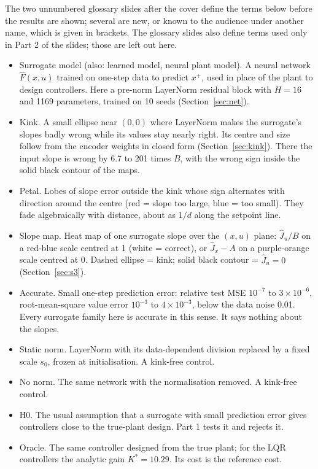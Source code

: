 \documentclass[11pt]{article}
\begin{document}
The two unnumbered glossary slides after the cover define the terms below before the results are shown; several are new, or known to the audience under another name, which is given in brackets. The glossary slides also define terms used only in Part 2 of the slides; those are left out here.

\begin{itemize}
\item Surrogate model (also: learned model, neural plant model). A neural network $\hat F(x,u)$ trained on one-step data to predict $x^+$, used in place of the plant to design controllers. Here a pre-norm LayerNorm residual block with $H=16$ and 1169 parameters, trained on 10 seeds (Section~\ref{sec:net}).
\item Kink. A small ellipse near $(0,0)$ where LayerNorm makes the surrogate's slopes badly wrong while its values stay nearly right. Its centre and size follow from the encoder weights in closed form (Section~\ref{sec:kink}). There the input slope is wrong by 6.7 to 201 times $B$, with the wrong sign inside the solid black contour of the maps.
\item Petal. Lobes of slope error outside the kink whose sign alternates with direction around the centre (red = slope too large, blue = too small). They fade algebraically with distance, about as $1/d$ along the setpoint line.
\item Slope map. Heat map of one surrogate slope over the $(x,u)$ plane: $\hat J_u/B$ on a red-blue scale centred at 1 (white = correct), or $\hat J_x-A$ on a purple-orange scale centred at 0. Dashed ellipse = kink; solid black contour = $\hat J_u=0$ (Section~\ref{sec:s3}).
\item Accurate. Small one-step prediction error: relative test MSE $10^{-7}$ to $3\times10^{-6}$, root-mean-square value error $10^{-3}$ to $4\times10^{-3}$, below the data noise 0.01. Every surrogate family here is accurate in this sense. It says nothing about the slopes.
\item Static norm. LayerNorm with its data-dependent division replaced by a fixed scale $s_0$, frozen at initialisation. A kink-free control.
\item No norm. The same network with the normalisation removed. A kink-free control.
\item H0. The usual assumption that a surrogate with small prediction error gives controllers close to the true-plant design. Part 1 tests it and rejects it.
\item Oracle. The same controller designed from the true plant; for the LQR controllers the analytic gain $K^*=10.29$. Its cost is the reference cost.

\end{itemize}
\end{document}
